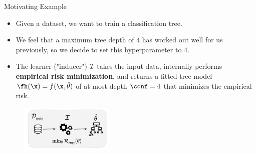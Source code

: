 
\subtitle{Overview and Introduction}




\maketitle



\begin{frame}{Motivating Example}

\begin{itemize}
\item Given a dataset, we want to train a classification tree.
\item We feel that a maximum tree depth of $4$ has worked out well for us previously, so we decide to set this hyperparameter to $4$.
\item The learner ("inducer") $\mathcal{I}$ takes the input data, internally performs \textbf{empirical risk minimization}, and returns a fitted tree model $\fh(\x) = f(\x, \hat{\theta})$ of at most depth $\conf = 4$ that minimizes the empirical risk.
\end{itemize}

\begin{center}
\begin{figure}
\includegraphics[width=0.4\textwidth]{images/riskmin_bilevel1.png}
\end{figure}
\end{center}

\framebreak


\end{frame}
